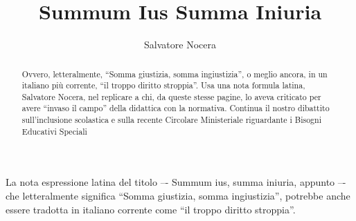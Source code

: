 \author{Salvatore Nocera}
\title{Summum Ius Summa Iniuria}
\label{cha:nocera130613}
\begin{abstract}
Ovvero, letteralmente, “Somma giustizia, somma ingiustizia”, o meglio ancora, in un italiano più corrente, “il troppo diritto stroppia”. Usa una nota formula latina, Salvatore Nocera, nel replicare a chi, da queste stesse pagine, lo aveva criticato per avere “invaso il campo” della didattica con la normativa. Continua il nostro dibattito sull'inclusione scolastica e sulla recente Circolare Ministeriale riguardante i Bisogni Educativi Speciali
\end{abstract}
\maketitle
La nota espressione latina del titolo –- Summum ius, summa iniuria, appunto –- che letteralmente significa “Somma giustizia, somma ingiustizia”, potrebbe anche essere tradotta in italiano corrente come “il troppo diritto stroppia”.

